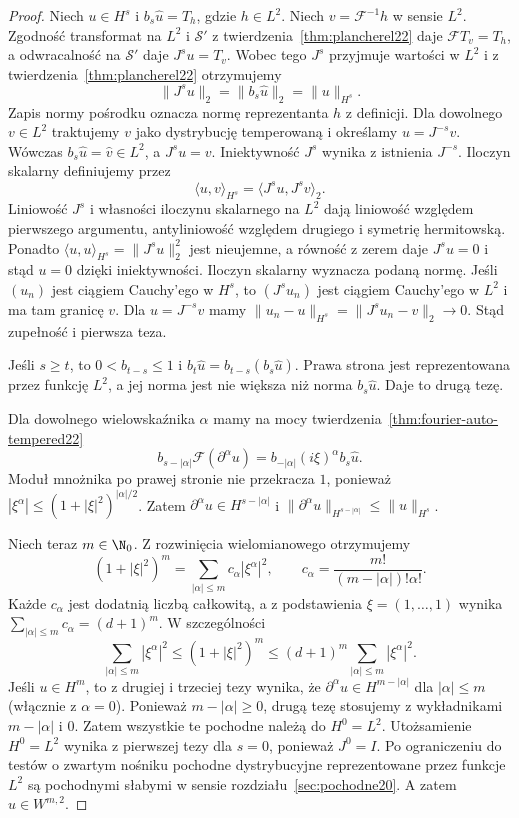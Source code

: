 \begin{proof}
Niech $u\in H^s$ i $b_s\widehat u=T_h$,
gdzie $h\in L^2$. Niech $v=\mathcal F^{-1}h$
w sensie $L^2$. Zgodność transformat na $L^2$
i $\mathcal S'$ z twierdzenia~\ref{thm:plancherel22}
daje $\mathcal FT_v=T_h$, a odwracalność
na $\mathcal S'$ daje $J^su=T_v$.
Wobec tego $J^s$ przyjmuje wartości w $L^2$
i z twierdzenia~\ref{thm:plancherel22}
otrzymujemy
\[
 \|J^s u\|_2=\|b_s\widehat u\|_2
 =\|u\|_{H^s}.
\]
Zapis normy pośrodku oznacza normę reprezentanta
$h$ z definicji. Dla dowolnego $v\in L^2$
traktujemy $v$ jako dystrybucję temperowaną
i określamy $u=J^{-s}v$. Wówczas
$b_s\widehat u=\widehat v\in L^2$, a $J^su=v$.
Iniektywność $J^s$ wynika z istnienia $J^{-s}$.
Iloczyn skalarny definiujemy przez
\[
 \langle u,v\rangle_{H^s}
 =\langle J^s u,J^s v\rangle_2.
\]
Liniowość $J^s$ i własności iloczynu skalarnego
na $L^2$ dają liniowość względem pierwszego
argumentu, antyliniowość względem drugiego
i symetrię hermitowską.
Ponadto $\langle u,u\rangle_{H^s}=\|J^su\|_2^2$
jest nieujemne, a równość z zerem daje $J^su=0$
i stąd $u=0$ dzięki iniektywności.
Iloczyn skalarny wyznacza podaną normę.
Jeśli $(u_n)$ jest ciągiem Cauchy'ego w $H^s$,
to $(J^su_n)$ jest ciągiem Cauchy'ego w $L^2$
i ma tam granicę $v$. Dla $u=J^{-s}v$ mamy
$\|u_n-u\|_{H^s}=\|J^s u_n-v\|_2\to0$.
Stąd zupełność i pierwsza teza.

Jeśli $s\ge t$, to $0<b_{t-s}\le1$ i
$b_t\widehat u=b_{t-s}(b_s\widehat u)$.
Prawa strona jest reprezentowana przez funkcję
$L^2$, a jej norma jest nie większa niż norma
$b_s\widehat u$. Daje to drugą tezę.

Dla dowolnego wielowskaźnika $\alpha$ mamy
na mocy twierdzenia~\ref{thm:fourier-auto-tempered22}
\[
 b_{s-|\alpha|}\mathcal F(\partial^\alpha u)
 =b_{-|\alpha|}(i\xi)^\alpha b_s\widehat u.
\]
Moduł mnożnika po prawej stronie nie przekracza
$1$, ponieważ
$|\xi^\alpha|\le(1+|\xi|^2)^{|\alpha|/2}$.
Zatem $\partial^\alpha u\in H^{s-|\alpha|}$
i $\|\partial^\alpha u\|_{H^{s-|\alpha|}}
\le\|u\|_{H^s}$.

Niech teraz $m\in\N_0$. Z rozwinięcia
wielomianowego otrzymujemy
\[
 (1+|\xi|^2)^m
 =\sum_{|\alpha|\le m}c_\alpha|\xi^\alpha|^2,
 \qquad c_\alpha=\frac{m!}{(m-|\alpha|)!\alpha!}.
\]
Każde $c_\alpha$ jest dodatnią liczbą całkowitą,
a z podstawienia $\xi=(1,\ldots,1)$ wynika
$\sum_{|\alpha|\le m}c_\alpha=(d+1)^m$.
W szczególności
\[
 \sum_{|\alpha|\le m}|\xi^\alpha|^2
 \le (1+|\xi|^2)^m
 \le (d+1)^m\sum_{|\alpha|\le m}|\xi^\alpha|^2.
\]
Jeśli $u\in H^m$, to z drugiej i trzeciej tezy
wynika, że $\partial^\alpha u\in H^{m-|\alpha|}$
dla $|\alpha|\le m$ (włącznie z $\alpha=0$).
Ponieważ $m-|\alpha|\ge0$, drugą tezę
stosujemy z wykładnikami $m-|\alpha|$ i $0$.
Zatem wszystkie te pochodne należą do $H^0=L^2$.
Utożsamienie $H^0=L^2$ wynika z pierwszej tezy
dla $s=0$, ponieważ $J^0=I$.
Po ograniczeniu do testów o zwartym nośniku
pochodne dystrybucyjne reprezentowane przez
funkcje $L^2$ są pochodnymi słabymi w sensie
rozdziału~\ref{sec:pochodne20}.
A zatem $u\in W^{m,2}$.


\end{proof}
